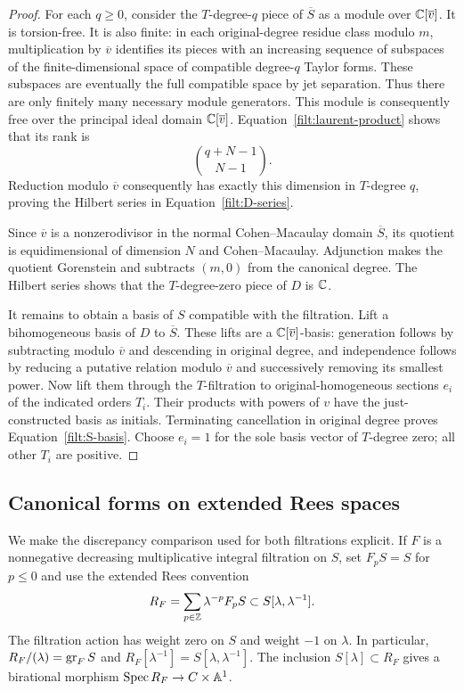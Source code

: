 \begin{proof}
For each $q\geq0$, consider the $T$-degree-$q$ piece of $\overline S$ as
a module over $\mathbb C[\overline v]$.  It is torsion-free.  It is also finite:
in each original-degree residue class modulo $m$, multiplication by
$\overline v$ identifies its pieces with an increasing sequence of
subspaces of the finite-dimensional space of compatible degree-$q$
Taylor forms.  These subspaces are eventually the full compatible space
by jet separation.  Thus there are only finitely many necessary module
generators.  This module is consequently free over the principal ideal
domain $\mathbb C[\overline v]$.  Equation~\eqref{filt:laurent-product} shows
that its rank is
\[
 \binom{q+N-1}{N-1}.
\]
Reduction modulo $\overline v$ consequently has exactly this dimension
in $T$-degree $q$, proving the Hilbert series in
Equation~\eqref{filt:D-series}.

Since $\overline v$ is a nonzerodivisor in the normal
Cohen--Macaulay domain $\overline S$, its quotient is equidimensional of
dimension $N$ and Cohen--Macaulay.  Adjunction makes the quotient
Gorenstein and subtracts $(m,0)$ from the canonical degree.  The Hilbert
series shows that the $T$-degree-zero piece of $D$ is $\mathbb C$.

It remains to obtain a basis of $S$ compatible with the filtration.
Lift a bihomogeneous basis of $D$ to $\overline S$.  These lifts are a
$\mathbb C[\overline v]$-basis: generation follows by subtracting modulo
$\overline v$ and descending in original degree, and independence follows
by reducing a putative relation modulo $\overline v$ and successively
removing its smallest power.  Now lift them through the $T$-filtration
to original-homogeneous sections $e_i$ of the indicated orders $T_i$.
Their products with powers of $v$ have the just-constructed basis as
initials.  Terminating cancellation in original degree proves
Equation~\eqref{filt:S-basis}.  Choose $e_i=1$ for the sole basis vector
of $T$-degree zero; all other $T_i$ are positive.
\end{proof}

\subsection{Canonical forms on extended Rees spaces}

We make the discrepancy comparison used for both filtrations explicit.
If $F$ is a nonnegative decreasing multiplicative integral filtration on
$S$, set
$F_pS=S$ for $p\leq0$ and use the extended Rees convention
\begin{equation}\label{filt:rees-convention}
 R_F=\sum_{p\in\mathbb Z}\lambda^{-p}F_pS
       \subset S[\lambda,\lambda^{-1}].
\end{equation}
The filtration action has weight zero on $S$ and weight $-1$ on
$\lambda$.  In particular, $R_F/(\lambda)=\operatorname{gr}_F S$ and
$R_F[\lambda^{-1}]=S[\lambda,\lambda^{-1}]$.  The inclusion
$S[\lambda]\subset R_F$ gives a birational morphism
$\operatorname{Spec} R_F\to C\times\mathbb A^1$.

